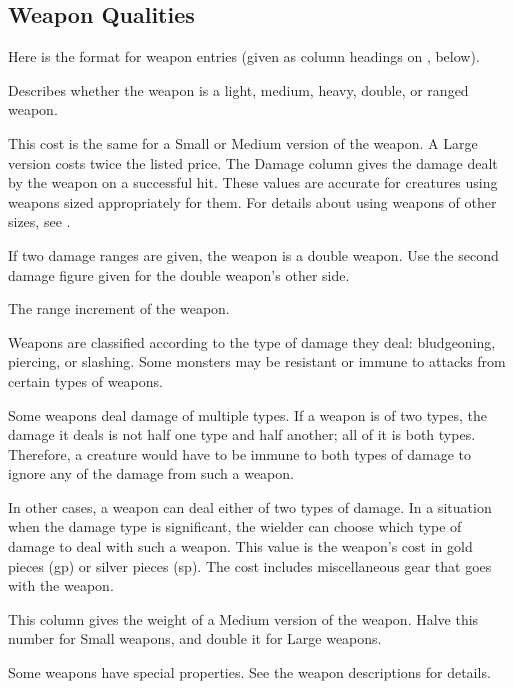     \subsection{Weapon Qualities}
        Here is the format for weapon entries (given as column headings on , below).

         Describes whether the weapon is a light, medium, heavy, double, or ranged weapon.

        \par This cost is the same for a Small or Medium version of the weapon. A Large version costs twice the listed price.
         The Damage column gives the damage dealt by the weapon on a successful hit.
        These values are accurate for creatures using weapons sized appropriately for them.
        For details about using weapons of other sizes, see .

        If two damage ranges are given, the weapon is a double weapon. Use the second damage figure given for the double weapon's other side.

         The range increment of the weapon.

         Weapons are classified according to the type of damage they deal: bludgeoning, piercing, or slashing. Some monsters may be resistant or immune to attacks from certain types of weapons.

        Some weapons deal damage of multiple types. If a weapon is of two types, the damage it deals is not half one type and half another; all of it is both types. Therefore, a creature would have to be immune to both types of damage to ignore any of the damage from such a weapon.

        In other cases, a weapon can deal either of two types of damage. In a situation when the damage type is significant, the wielder can choose which type of damage to deal with such a weapon.
         This value is the weapon's cost in gold pieces (gp) or silver pieces (sp). The cost includes miscellaneous gear that goes with the weapon.

         This column gives the weight of a Medium version of the weapon. Halve this number for Small weapons, and double it for Large weapons.

         Some weapons have special properties. See the weapon
        descriptions for details.

